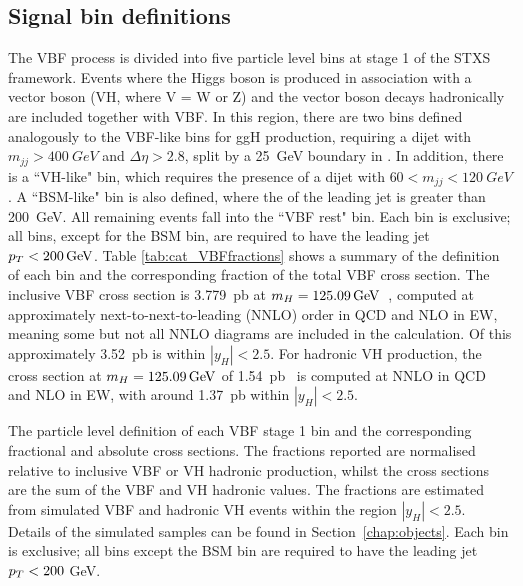 \subsection{Signal bin definitions}

The VBF process is divided into five particle level bins at stage 1 of the STXS framework.
Events where the Higgs boson is produced in association with a vector boson (VH, where V = W or Z) 
and the vector boson decays hadronically are included together with VBF.
In this region, there are two bins defined analogously to the VBF-like bins for ggH production, 
requiring a dijet with $m_{jj} > \SI{400}{GeV}$ and $\Delta\eta > 2.8$, 
split by a \SI{25}{GeV} boundary in \ptHjj.
In addition, there is a ``VH-like" bin, 
which requires the presence of a dijet with $60 < m_{jj} < \SI{120}{GeV}$. 
A ``BSM-like" bin is also defined, where the \pt of the leading jet is greater than \SI{200}{GeV}.
All remaining events fall into the ``VBF rest" bin.
Each bin is exclusive; all bins, except for the BSM bin, 
are required to have the leading jet $p_T < \SI{200}{GeV}$.
Table \ref{tab:cat_VBFfractions} shows a summary of the definition of each bin 
and the corresponding fraction of the total VBF cross section.
The inclusive VBF cross section is \SI{3.779}{pb} at $m_{H} = \SI{125.09}{GeV}$~\cite{YR4},
computed at approximately next-to-next-to-leading (NNLO) order in QCD and NLO in EW,
meaning some but not all NNLO diagrams are included in the calculation.
Of this approximately \SI{3.52}{pb} is within $|y_H| < 2.5$.
For hadronic VH production, 
the cross section at $m_{H} = \SI{125.09}{GeV}$ of \SI{1.54}{pb}~\cite{YR4}
is computed at NNLO in QCD and NLO in EW, 
with around \SI{1.37}{pb} within $|y_H| < 2.5$.

\begin{table}
  \begin{centering}
    
    \caption[Particle level definitions of the VBF stage 1 STXS bins.]
    {
      The particle level definition of each VBF stage 1 bin 
      and the corresponding fractional and absolute cross sections.
      The fractions reported are normalised relative to inclusive VBF or VH hadronic production, 
      whilst the cross sections are the sum of the VBF and VH hadronic values.
      The fractions are estimated from simulated VBF and hadronic VH \Hgg events 
      within the region $|y_H| < 2.5$.
      Details of the simulated samples can be found in Section~\ref{chap:objects}.
      Each bin is exclusive; all bins except the BSM bin 
      are required to have the leading jet $p_T < 200$ GeV.
    }
    \label{tab:cat_VBFfractions}
  \end{centering}
\end{table}

